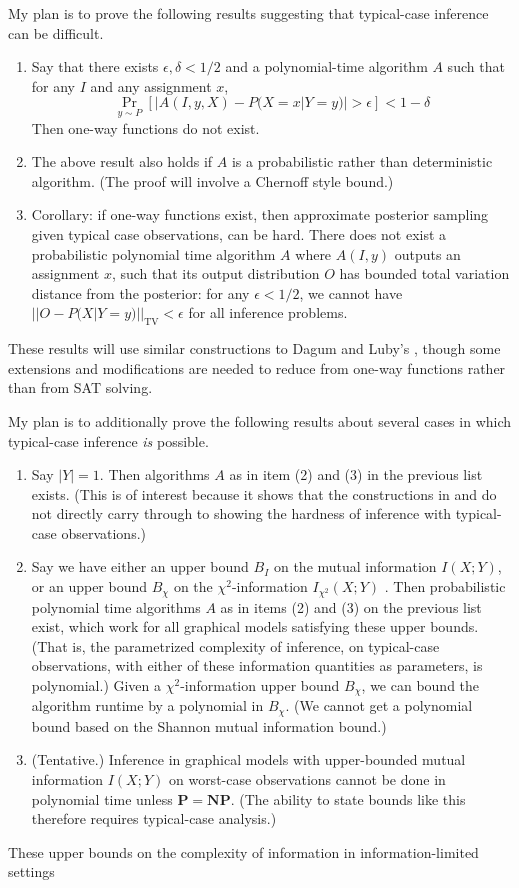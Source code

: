 \documentclass{article}
\renewcommand{\P}{\mathbf{P}}
\newcommand{\NP}{\mathbf{NP}}
\theoremstyle{definition}
\theoremstyle{remark}
\begin{document}
My plan is to prove the following results suggesting that typical-case inference can be difficult.
\begin{enumerate}
    \item Say that there exists $\epsilon, \delta < 1/2$ and a polynomial-time algorithm $A$ such that for any $I$ and any assignment $x$, $$\Pr_{y \sim P}[|A(I, y, X) - P(X = x | Y = y)| > \epsilon] < 1 - \delta$$ Then one-way functions do not exist.
    \item The above result also holds if $A$ is a probabilistic rather than deterministic algorithm.  (The proof will involve a Chernoff style bound.)
    \item Corollary: if one-way functions exist, then approximate posterior sampling given typical case observations, can be hard.  There does not exist a probabilistic polynomial time algorithm $A$ where $A(I, y)$ outputs an assignment $x$, such that its output distribution $O$ has bounded total variation distance from the posterior: for any $\epsilon < 1/2$, we cannot have $||O - P(X | Y = y)||_{\text{TV}} < \epsilon$ for all inference problems.
\end{enumerate}
These results will use similar constructions to Dagum and Luby's \cite{dagum1993}, though some extensions and modifications are needed to reduce from one-way functions rather than from SAT solving.

My plan is to additionally prove the following results about several cases in which typical-case inference \textit{is} possible.
\begin{enumerate}
    \item Say $|Y| = 1$.  Then algorithms $A$ as in item (2) and (3) in the previous list exists.  (This is of interest because it shows that the constructions in \cite{cooper1990} and \cite{dagum1993} do not directly carry through to showing the hardness of inference with typical-case observations.)
    \item Say we have either an upper bound $B_I$ on the mutual information $I(X ; Y)$, or an upper bound $B_\chi$ on the $\chi^2$-information $I_{\chi^2}(X; Y)$ \cite{f_information}. Then probabilistic polynomial time algorithms $A$ as in items (2) and (3) on the previous list exist, which work for all graphical models satisfying these upper bounds.  (That is, the parametrized complexity of inference, on typical-case observations, with either of these information quantities as parameters, is polynomial.)  Given a $\chi^2$-information upper bound $B_\chi$, we can bound the algorithm runtime by a polynomial in $B_\chi$.  (We cannot get a polynomial bound based on the Shannon mutual information bound.)
    \item (Tentative.) Inference in graphical models with upper-bounded mutual information $I(X; Y)$ on worst-case observations cannot be done in polynomial time unless $\P = \NP$.
    (The ability to state bounds like this therefore requires typical-case analysis.)
\end{enumerate}
These upper bounds on the complexity of information in information-limited settings 
\end{document}
